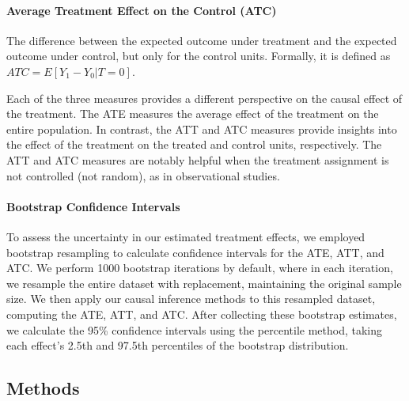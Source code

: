\documentclass{article}
\begin{document}
\paragraph{Average Treatment Effect on the Control (ATC)} The difference between the expected outcome under treatment and the expected outcome under control, but only for the control units. Formally, it is defined as $ATC = E[Y_1 - Y_0 | T = 0]$. 

Each of the three measures provides a different perspective on the causal effect of the treatment. The ATE measures the average effect of the treatment on the entire population. In contrast, the ATT and ATC measures provide insights into the effect of the treatment on the treated and control units, respectively. The ATT and ATC measures are notably helpful when the treatment assignment is not controlled (not random), as in observational studies.

\paragraph{Bootstrap Confidence Intervals} To assess the uncertainty in our estimated treatment effects, we employed bootstrap resampling to calculate confidence intervals for the ATE, ATT, and ATC. We perform 1000 bootstrap iterations by default, where in each iteration, we resample the entire dataset with replacement, maintaining the original sample size. We then apply our causal inference methods to this resampled dataset, computing the ATE, ATT, and ATC. After collecting these bootstrap estimates, we calculate the 95\% confidence intervals using the percentile method, taking each effect's 2.5th and 97.5th percentiles of the bootstrap distribution. 

\subsection{Methods}
\end{document}
